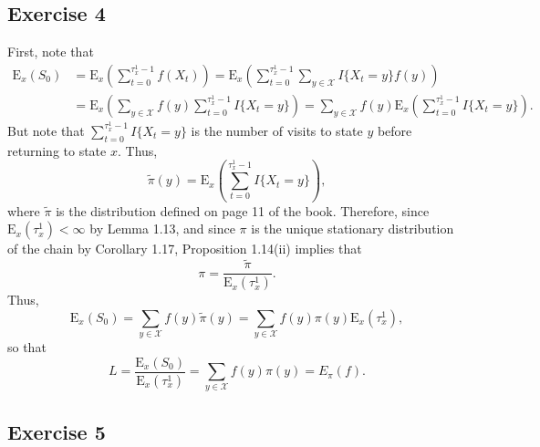 \documentclass[12pt]{article}
\newcommand{\E}{\mathrm{E}}
\begin{document}
\subsection*{Exercise 4}

First, note that
\begin{align*}
\E_x(S_0) &= \E_x\left(\sum_{t=0}^{\tau_x^1 - 1} f(X_t) \right) = \E_x\left(\sum_{t=0}^{\tau_x^1 - 1} \sum_{y \in \mathcal{X}} I\{X_t = y\} f(y) \right) \\
&= \E_x\left(\sum_{y \in \mathcal{X}} f(y) \sum_{t=0}^{\tau_x^1 - 1} I\{X_t = y\} \right) = \sum_{y \in \mathcal{X}} f(y) \E_x\left(\sum_{t=0}^{\tau_x^1 - 1} I\{X_t = y\} \right).
\end{align*}
But note that $\sum_{t=0}^{\tau_x^1 - 1} I\{X_t = y\}$ is the number of visits to state $y$ before returning to state $x$. Thus,
\begin{equation*}
\tilde{\pi}(y) = \E_x\left(\sum_{t=0}^{\tau_x^1 - 1} I\{X_t = y\} \right),
\end{equation*}
where $\tilde{\pi}$ is the distribution defined on page 11 of the book. Therefore, since $\E_x(\tau_x^1) < \infty$ by Lemma 1.13, and since $\pi$ is the unique stationary distribution of the chain by Corollary 1.17, Proposition 1.14(ii) implies that
\begin{equation*}
\pi = \frac{\tilde{\pi}}{\E_x(\tau_x^1)}.
\end{equation*}
Thus,
\begin{equation*}
\E_x(S_0) = \sum_{y \in \mathcal{X}} f(y) \tilde{\pi}(y) = \sum_{y \in \mathcal{X}} f(y) \pi(y) \E_x(\tau_x^1),
\end{equation*}
so that
\begin{equation*}
L = \frac{\E_x(S_0)}{\E_x(\tau_x^1)} = \sum_{y \in \mathcal{X}} f(y) \pi(y) = E_\pi(f).
\end{equation*}

\subsection*{Exercise 5}
\end{document}
